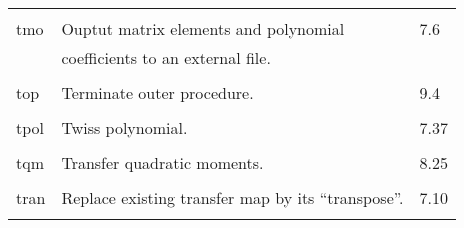 \begin{center}
\begin{tabular}{lll}
\vspace{-3mm}& &\\
\hspace{1.5em}tmo   &  Ouptut matrix elements and polynomial & \hspace{2em}7.6\\
                    & coefficients to an external file.            &\\
\vspace{-3mm}& &\\
\hspace{1.5em}top    &  Terminate outer procedure.         &     \hspace{2em}9.4\\
\vspace{-3mm}& &\\
\hspace{1.5em}tpol  & Twiss polynomial.          & \hspace{2em}7.37\\
\vspace{-3mm}& &\\
\hspace{1.5em}tqm  & Transfer quadratic moments. & \hspace{2em}8.25\\
\vspace{-3mm}& &\\
\hspace{1.5em}tran  & Replace existing transfer map by its ``transpose''. & \hspace{2em}7.10\\
\vspace{-3mm}& &\\
\end{tabular}


\end{center}
